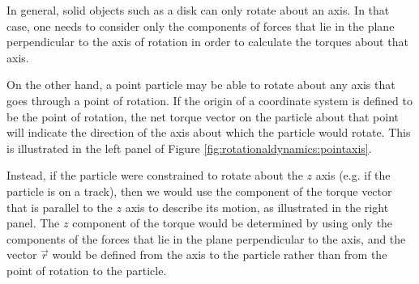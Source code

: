 In general, solid objects such as a disk can only rotate about an axis. In that case, one needs to consider only the components of forces that lie in the plane perpendicular to the axis of rotation in order to calculate the torques about that axis.

On the other hand, a point particle may be able to rotate about any axis that goes through a point of rotation. If the origin of a coordinate system is defined to be the point of rotation, the net torque vector on the particle about that point will indicate the direction of the axis about which the particle would rotate. This is illustrated in the left panel of Figure \ref{fig:rotationaldynamics:pointaxis}.

Instead, if the particle were constrained to rotate about the $z$ axis (e.g. if the particle is on a track), then we would use the component of the torque vector that is parallel to the $z$ axis to describe its motion, as illustrated in the right panel. The $z$ component of the torque would be determined by using only the components of the forces that lie in the plane perpendicular to the axis, and the vector $\vec r$ would be defined from the axis to the particle rather than from the point of rotation to the particle.


